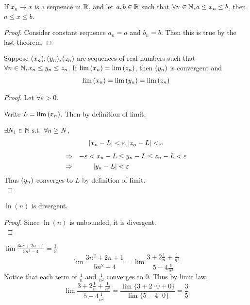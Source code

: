 \documentclass[a4paper,12pt]{article}
\begin{document}
\begin{theorem}
    If \(x_n\rightarrow x\) is a sequence in \(\mathbb{R}\), and let \(a,b\in\mathbb{R}\) such that 
    \(\forall n\in\mathbb{N}, a\le x_n\le b\), then \(a\le x\le b\).
    \begin{proof}
        Consider constant sequence \(a_n=a\) and \(b_n=b\). Then this is true by the last theorem.
    \end{proof}
\end{theorem}

\begin{theorem}
    Suppose \((x_{n}),(y_{n}),(z_{n})\) are sequences of real numbers such that \(\forall n\in\mathbb{N},x_n\le y_n\le z_n\).
    If \(\lim{(x_{n})}=\lim{(z_{n})}\), then \((y_{n})\) is convergent and 
    \[\lim{(x_{n})}=\lim{(y_{n})}=\lim{(z_{n})}\]
    
    \begin{proof}
        Let \(\forall \varepsilon >0\).

        Write \(L=\lim{(x_{n})}\). Then by definition of limit,
        
        \(\exists N_1\in\mathbb{N} \text{ s.t. } \forall n\ge N\),
        \[\left\lvert x_n-L\right\rvert<\varepsilon, \left\lvert z_n-L\right\rvert<\varepsilon\]
        \begin{align*}
            \Rightarrow&& -\varepsilon<x_n-L&\le y_n-L\le z_n-L<\varepsilon\\
            \Rightarrow&& \left\lvert y_n-L\right\rvert&<\varepsilon\\
        \end{align*}
        Thus \((y_{n})\) converges to \(L\) by definition of limit.\\
    \end{proof}
\end{theorem}

\begin{proposition}
    \(\ln{(n)}\) is divergent.
    \begin{proof}
        Since \(\ln(n)\) is unbounded, it is divergent.\\
    \end{proof}
\end{proposition}

\begin{exercise}
    \(\lim{\frac{3n^2+2n+1}{5n^2-4}}=\frac{3}{5}\)
    \[\lim{\frac{3n^2+2n+1}{5n^2-4}}=\lim{\frac{3+2\frac{1}{n}+\frac{1}{n^2}}{5-4\frac{1}{n^2}}}\]
    Notice that each term of \(\frac{1}{n}\) and \(\frac{1}{n^2}\) converges to 0. Thus by limit law, 
    \[\lim{\frac{3+2\frac{1}{n}+\frac{1}{n^2}}{5-4\frac{1}{n^2}}}=\frac{\lim{\{3+2\cdot 0+0\}}}{\lim\{5-4\cdot 0\}}=\frac{3}{5}\]
\end{exercise}
\end{document}

